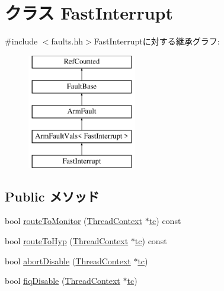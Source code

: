 \hypertarget{classArmISA_1_1FastInterrupt}{
\section{クラス FastInterrupt}
\label{classArmISA_1_1FastInterrupt}
}


{\ttfamily \#include $<$faults.hh$>$}FastInterruptに対する継承グラフ:\begin{figure}[H]
\begin{center}
\leavevmode
\includegraphics[height=5cm]{classArmISA_1_1FastInterrupt}
\end{center}
\end{figure}
\subsection*{Public メソッド}
\begin{DoxyCompactItemize}
\item 
bool \hyperlink{classArmISA_1_1FastInterrupt_afd7a21fdb010230ad53094254739dde8}{routeToMonitor} (\hyperlink{classThreadContext}{ThreadContext} $\ast$\hyperlink{namespaceArmISA_a5aff829af55e65b802d83dfcef4e9dd0}{tc}) const 
\item 
bool \hyperlink{classArmISA_1_1FastInterrupt_a16facd13ba8e6d15d2b865882c379d5f}{routeToHyp} (\hyperlink{classThreadContext}{ThreadContext} $\ast$\hyperlink{namespaceArmISA_a5aff829af55e65b802d83dfcef4e9dd0}{tc}) const 
\item 
bool \hyperlink{classArmISA_1_1FastInterrupt_a92a741baab278ed029d84b0fe979e1b8}{abortDisable} (\hyperlink{classThreadContext}{ThreadContext} $\ast$\hyperlink{namespaceArmISA_a5aff829af55e65b802d83dfcef4e9dd0}{tc})
\item 
bool \hyperlink{classArmISA_1_1FastInterrupt_a5f03475ae417a13eb48c2593f9f5b5a6}{fiqDisable} (\hyperlink{classThreadContext}{ThreadContext} $\ast$\hyperlink{namespaceArmISA_a5aff829af55e65b802d83dfcef4e9dd0}{tc})
\end{DoxyCompactItemize}


